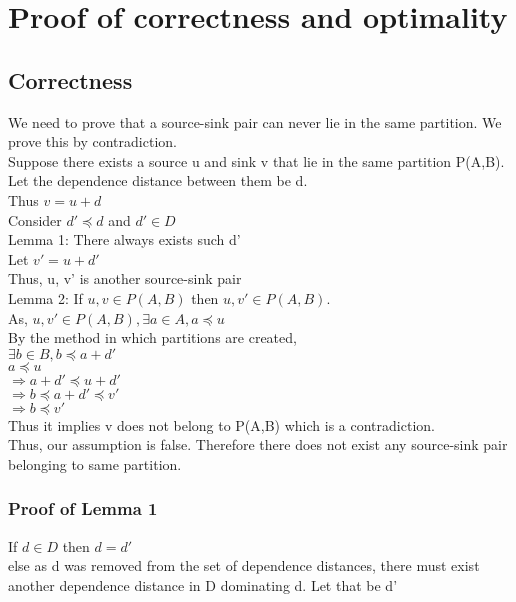 \chapter{Proof of correctness and optimality}

\section{Correctness}
We need to prove that a source-sink pair can never lie in the same partition. We prove this by contradiction. \\

Suppose there exists a source u and sink v that lie in the same partition P(A,B).
Let the dependence distance between them be d.\\
Thus $v = u + d$\\
Consider $d' \preceq d$ and $d' \in D$\\

Lemma 1: There always exists such d'\\

\noindent Let $ v' = u + d'$\\
Thus, u, v' is another source-sink pair\\

Lemma 2: If $u, v \in P(A,B)$  then $u , v' \in P(A,B)$.\\

\noindent As, $u, v' \in P(A,B), \exists a \in A, a \preceq u$ \\
By the method in which partitions are created, \\
$\exists b \in B, b \preceq a + d'$ \\
$a \preceq u$ \\
$ \Rightarrow a + d' \preceq u + d'$ \\
$\Rightarrow b \preceq a + d' \preceq v'$ \\
$\Rightarrow b \preceq v'$ \\
Thus it implies v does not belong to P(A,B) which is a contradiction. \\

Thus, our assumption is false. Therefore there does not exist any source-sink pair belonging to same partition.\\

\subsection{Proof of Lemma 1}
If $d \in D$ then $d = d'$\\
else as d was removed from the set of dependence distances, there must exist another dependence distance in D dominating d. Let that be d' \\


